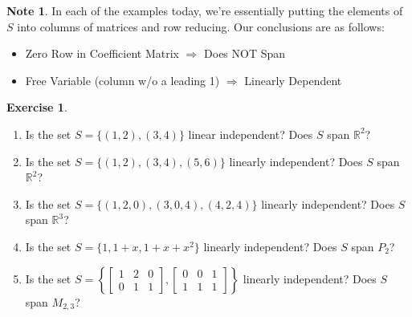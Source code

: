 \documentclass{beamer}
\newcommand{\R}{\mathbb{R}}
\newcommand{\fn}{\insertframenumber}
\theoremstyle{definition}
\newtheorem{exercise}{Exercise}
\newtheorem*{nb}{Note}
\begin{document}
\begin{frame}{\fn}
	\begin{nb}
		In each of the examples today, we're essentially putting the elements of $S$ into columns of matrices and row reducing.  Our conclusions are as follows:
			\begin{itemize}[label=--]
				\item Zero Row in Coefficient Matrix $\Rightarrow$ Does NOT Span
				\item Free Variable (column w/o a leading 1) $\Rightarrow$ Linearly Dependent
			\end{itemize}
	\end{nb}
\end{frame}
\begin{frame}{\fn}
	\begin{exercise}
		\begin{enumerate}[label = (\alph*)]\setlength{\itemsep}{.15in}
			\item Is the set $S=\{(1,2),(3,4)\}$ linear independent? Does $S$ span $\R^2$?
			\item Is the set $S=\{(1,2),(3,4), (5,6)\}$ linearly independent? Does $S$ span $\R^2$?
			\item Is the set $S=\{(1,2,0),(3,0,4), (4,2,4)\}$ linearly independent? Does $S$ span $\R^3$?
			\item Is the set $S=\{1,1+x,1+x+x^2\}$ linearly independent? Does $S$ span $P_2$?
			\item Is the set $S=\left\{\begin{bmatrix}1&2&0\\0&1&1\end{bmatrix},\begin{bmatrix}0&0&1\\1&1&1\end{bmatrix}\right\}$ linearly independent? Does $S$ span $M_{2,3}$?
		\end{enumerate}
	\end{exercise}
\end{frame}
\end{document}
